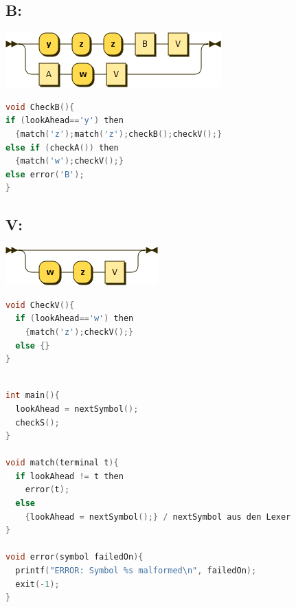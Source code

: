 \documentclass[11pt]{scrartcl}
\begin{document}
	\subsection*{B:}
	\begin{minipage}{0.4\textwidth}
	\includegraphics[width=1\linewidth]{ke-02/diagram/diagram/B}
	
	\end{minipage}
	\begin{minipage}{0.6\textwidth}
	\begin{lstlisting}[language=C]		
void CheckB(){
if (lookAhead=='y') then 
  {match('z');match('z');checkB();checkV();}
else if (checkA()) then 
  {match('w');checkV();}
else error('B');
}
\end{lstlisting}
	\end{minipage}
	\subsection*{V:}
	\begin{minipage}{0.4\textwidth}
	\includegraphics[width=1\linewidth]{ke-02/diagram/diagram/V}
	\end{minipage}
	\begin{minipage}{0.6\textwidth}
		\begin{lstlisting}[language=C]		
void CheckV(){
  if (lookAhead=='w') then 
    {match('z');checkV();}
  else {}
}
		\end{lstlisting}
	\end{minipage}
\begin{lstlisting}[language=C]

int main(){
  lookAhead = nextSymbol();
  checkS();
}
		
void match(terminal t){
  if lookAhead != t then 
    error(t);
  else
    {lookAhead = nextSymbol();} / nextSymbol aus den Lexer
}

void error(symbol failedOn){
  printf("ERROR: Symbol %s malformed\n", failedOn);
  exit(-1);
}

\end{lstlisting}
\end{document}
